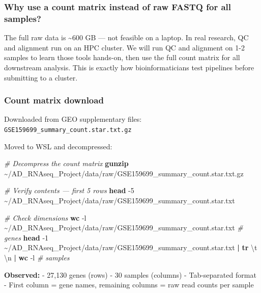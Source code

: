 \documentclass[
]{article}
\newenvironment{Shaded}{\begin{snugshade}}{\end{snugshade}}
\newcommand{\AttributeTok}[1]{\textcolor[rgb]{0.13,0.29,0.53}{#1}}
\newcommand{\CommentTok}[1]{\textcolor[rgb]{0.56,0.35,0.01}{\textit{#1}}}
\newcommand{\FunctionTok}[1]{\textcolor[rgb]{0.13,0.29,0.53}{\textbf{#1}}}
\newcommand{\KeywordTok}[1]{\textcolor[rgb]{0.13,0.29,0.53}{\textbf{#1}}}
\newcommand{\NormalTok}[1]{#1}
\newcommand{\StringTok}[1]{\textcolor[rgb]{0.31,0.60,0.02}{#1}}
\begin{document}
\subsubsection{Why use a count matrix instead of raw FASTQ for all
samples?}\label{why-use-a-count-matrix-instead-of-raw-fastq-for-all-samples}

The full raw data is \textasciitilde600 GB --- not feasible on a laptop.
In real research, QC and alignment run on an HPC cluster. We will run QC
and alignment on 1-2 samples to learn those tools hands-on, then use the
full count matrix for all downstream analysis. This is exactly how
bioinformaticians test pipelines before submitting to a cluster.

\subsubsection{Count matrix download}\label{count-matrix-download}

Downloaded from GEO supplementary files:
\texttt{GSE159699\_summary\_count.star.txt.gz}

Moved to WSL and decompressed:

\begin{Shaded}
\begin{Highlighting}[]
\CommentTok{\# Decompress the count matrix}
\FunctionTok{gunzip}\NormalTok{ \textasciitilde{}/AD\_RNAseq\_Project/data/raw/GSE159699\_summary\_count.star.txt.gz}

\CommentTok{\# Verify contents — first 5 rows}
\FunctionTok{head} \AttributeTok{{-}5}\NormalTok{ \textasciitilde{}/AD\_RNAseq\_Project/data/raw/GSE159699\_summary\_count.star.txt}

\CommentTok{\# Check dimensions}
\FunctionTok{wc} \AttributeTok{{-}l}\NormalTok{ \textasciitilde{}/AD\_RNAseq\_Project/data/raw/GSE159699\_summary\_count.star.txt   }\CommentTok{\# genes}
\FunctionTok{head} \AttributeTok{{-}1}\NormalTok{ \textasciitilde{}/AD\_RNAseq\_Project/data/raw/GSE159699\_summary\_count.star.txt }\KeywordTok{|} \FunctionTok{tr} \StringTok{\textquotesingle{}\textbackslash{}t\textquotesingle{}} \StringTok{\textquotesingle{}\textbackslash{}n\textquotesingle{}} \KeywordTok{|} \FunctionTok{wc} \AttributeTok{{-}l}  \CommentTok{\# samples}
\end{Highlighting}
\end{Shaded}

\textbf{Observed:} - 27,130 genes (rows) - 30 samples (columns) -
Tab-separated format - First column = gene names, remaining columns =
raw read counts per sample
\end{document}
